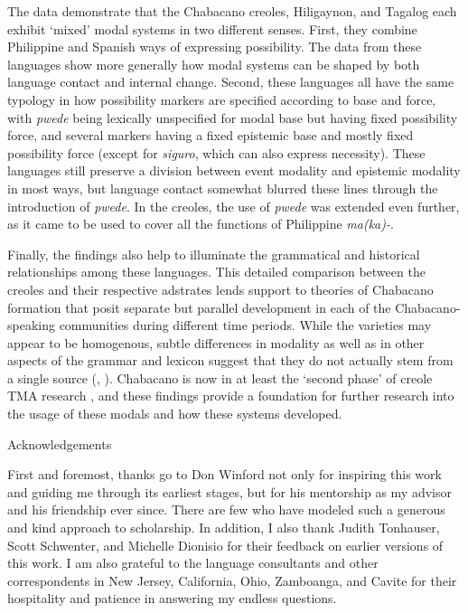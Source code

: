 The data demonstrate that the Chabacano creoles, Hiligaynon, and Tagalog each exhibit ‘mixed’ modal systems in two different senses. First, they combine Philippine and Spanish ways of expressing possibility. The data from these languages show more generally how modal systems can be shaped by both language contact and internal change. Second, these languages all have the same typology in how possibility markers are specified according to base and force, with \textit{pwede} being lexically unspecified for modal base but having fixed possibility force, and several markers having a fixed epistemic base and mostly fixed possibility force (except for \textit{siguro}, which can also express necessity). These languages still preserve a division between event modality and epistemic modality in most ways, but language contact somewhat blurred these lines through the introduction of \textit{pwede}. In the creoles, the use of \textit{pwede} was extended even further, as it came to be used to cover all the functions of Philippine \textit{ma(ka)-}.

Finally, the findings also help to illuminate the grammatical and historical relationships among these languages. This detailed comparison between the creoles and their respective adstrates lends support to theories of Chabacano formation that posit separate but parallel development in each of the Chabacano-speaking communities during different time periods. While the varieties may appear to be homogenous, subtle differences in modality as well as in other aspects of the grammar and lexicon suggest that they do not actually stem from a single source (\citealt{LeshoSippola2014}, \citealt{SippolaLesho2020}). Chabacano is now in at least the ‘second phase’ of creole TMA research \citep{Winford2018}, and these findings provide a foundation for further research into the usage of these modals and how these systems developed.

\begin{stylelsUnNumberedSection}
Acknowledgements
\end{stylelsUnNumberedSection}

First and foremost, thanks go to Don Winford not only for inspiring this work and guiding me through its earliest stages, but for his mentorship as my advisor and his friendship ever since. There are few who have modeled such a generous and kind approach to scholarship. In addition, I also thank Judith Tonhauser, Scott Schwenter, and Michelle Dionisio for their feedback on earlier versions of this work. I am also grateful to the language consultants and other correspondents in New Jersey, California, Ohio, Zamboanga, and Cavite for their hospitality and patience in answering my endless questions. 


